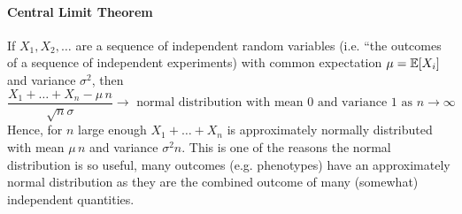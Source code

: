 \paragraph{Central Limit Theorem} If $X_1,X_2,\dots$ are a sequence of
independent random variables (i.e. ``the outcomes of a sequence of
independent experiments) with common expectation $\mu= \mathbb{E}[X_i]$ and 
variance $\sigma^2$, then 
\begin{equation}
\frac{X_1+\dots +X_n-\mu \,n }{\sqrt{n}\sigma} \to \mbox{ normal distribution with mean $0$ and variance $1$ as $n\to \infty$ }
\end{equation}
Hence, for $n$ large enough 
$
X_1+\dots+X_n 
$
is approximately normally distributed with mean $\mu\,n$ and variance
$\sigma^2 n$. This is one of the reasons the normal distribution is so
useful, many outcomes (e.g. phenotypes) have an approximately normal distribution as
they are the combined outcome of many (somewhat) independent quantities.  